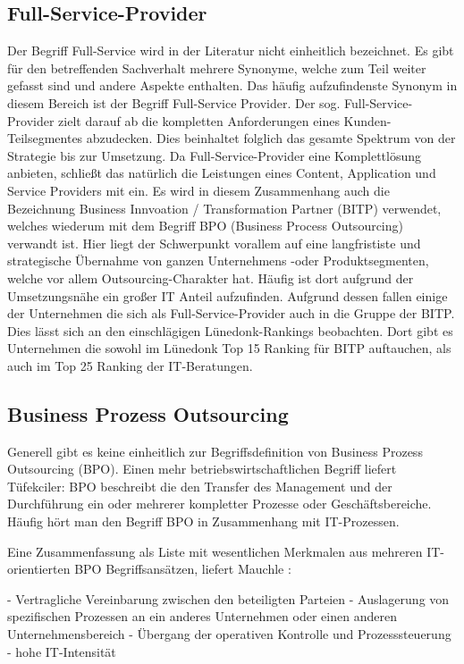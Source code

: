 \subsection{Full-Service-Provider}
Der Begriff Full-Service wird in der Literatur nicht einheitlich bezeichnet. Es gibt für den betreffenden Sachverhalt mehrere Synonyme, welche zum Teil weiter gefasst sind und andere Aspekte enthalten. Das häufig aufzufindenste Synonym in diesem Bereich ist der Begriff Full-Service Provider.
Der sog. \glqq Full-Service-Provider \grqq zielt darauf ab die kompletten Anforderungen eines Kunden-Teilsegmentes abzudecken. \cite[124]{WeillVitale200106} Dies beinhaltet folglich das gesamte Spektrum von der Strategie bis zur Umsetzung. Da Full-Service-Provider eine Komplettlösung anbieten, schließt das natürlich die Leistungen eines Content, Application und Service Providers mit ein. \cite[83]{Thalmann200708}
Es wird in diesem Zusammenhang auch die Bezeichnung Business Innvoation / Transformation Partner (BITP) verwendet, welches wiederum mit dem Begriff BPO (Business Process Outsourcing) verwandt ist. Hier liegt der Schwerpunkt vorallem auf eine langfrististe und strategische Übernahme von ganzen Unternehmens -oder Produktsegmenten, welche vor allem Outsourcing-Charakter hat.\cite[163]{Pohland200908} Häufig ist dort aufgrund der Umsetzungsnähe ein großer IT Anteil aufzufinden. Aufgrund dessen fallen einige der Unternehmen die sich als Full-Service-Provider auch in die Gruppe der BITP. Dies lässt sich an den einschlägigen Lünedonk-Rankings beobachten. Dort gibt es Unternehmen die sowohl im Lünedonk Top 15 Ranking für BITP auftauchen, als auch im Top 25 Ranking der IT-Beratungen.\cite {topBITP} \cite {topITB}

\subsection{Business Prozess Outsourcing }
Generell gibt es keine einheitlich zur Begriffsdefinition von Business Prozess Outsourcing (BPO). 
Einen mehr betriebswirtschaftlichen Begriff liefert Tüfekciler:
BPO beschreibt die den Transfer des Management und der Durchführung ein oder mehrerer kompletter Prozesse oder Geschäftsbereiche.  \cite[14]{tuefekciler2011human}
Häufig hört man den Begriff BPO in Zusammenhang mit IT-Prozessen. 

Eine Zusammenfassung als Liste mit wesentlichen Merkmalen aus mehreren IT-orientierten BPO Begriffsansätzen, liefert Mauchle \cite[6]{mauchle2012business}:

- Vertragliche Vereinbarung zwischen den beteiligten Parteien
- Auslagerung von spezifischen Prozessen an ein anderes Unternehmen oder einen anderen Unternehmensbereich
- Übergang der operativen Kontrolle und Prozesssteuerung
- hohe IT-Intensität

